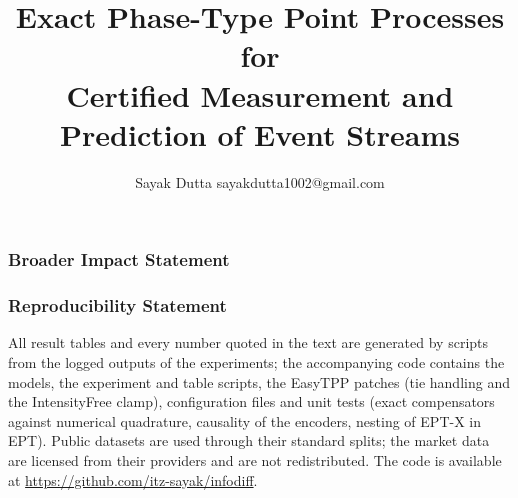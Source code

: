 \documentclass[10pt]{article}
\title{Exact Phase-Type Point Processes for\\
Certified Measurement and Prediction of Event Streams}
\author{\name Sayak Dutta \email sayakdutta1002@gmail.com}
\theoremstyle{remark}
\newcommand{\codename}{accompanying code}  %
\begin{document}
\maketitle

\begin{abstract}

\end{abstract}










\subsubsection*{Broader Impact Statement}


\subsubsection*{Reproducibility Statement}
All result tables and every number quoted in the text are generated by scripts from the logged
outputs of the experiments; the \codename{} contains the models, the experiment and
table scripts, the EasyTPP patches (tie handling and the IntensityFree clamp), configuration
files and unit tests (exact compensators against numerical quadrature, causality of the
encoders, nesting of EPT-X in EPT). Public datasets are used through their standard splits;
the market data are licensed from their providers and are not redistributed. The code is
available at \url{https://github.com/itz-sayak/infodiff}.




\appendix

\end{document}
